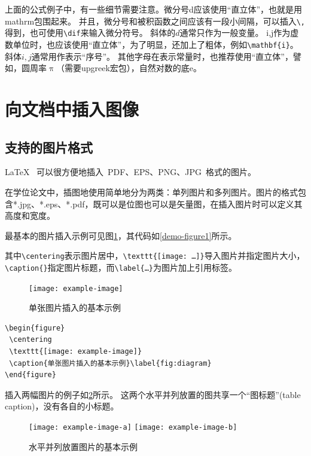 上面的公式例子中，有一些细节需要注意。微分号d应该使用``直立体''，也就是用mathrm包围起来。
并且，微分号和被积函数之间应该有一段小间隔，可以插入\verb+\,+得到，也可使用\verb+\dif+来输入微分符号。
斜体的$d$通常只作为一般变量。
i,j作为虚数单位时，也应该使用``直立体''，为了明显，还加上了粗体，例如\verb+\mathbf{i}+。斜体$i,j$通常用作表示``序号''。
其他字母在表示常量时，也推荐使用``直立体''，譬如，圆周率$\uppi$（需要upgreek宏包），自然对数的底$\mathrm{e}$。


\section{向文档中插入图像}
\label{sec:insertimage}

\subsection{支持的图片格式}
\label{sec:imageformat}

\LaTeX~ 可以很方便地插入~PDF、EPS、PNG、JPG~格式的图片。

在学位论文中，插图地使用简单地分为两类：单列图片和多列图片。图片的格式包含*.jpg、*.eps、*.pdf，既可以是位图也可以是矢量图，在插入图片时可以定义其高度和宽度。

最基本的图片插入示例可见图\ref{fig:diagram}，其代码如\ref{demo-figure1}所示。

其中\verb+\centering+表示图片居中，\verb+\texttt{[image: …]}+导入图片并指定图片大小，\verb+\caption{}+指定图片标题，而\verb+\label{…}+为图片加上引用标签。

\begin{figure}
 \centering
 \texttt{[image: example-image]}
 \caption{单张图片插入的基本示例}\label{fig:diagram}
\end{figure}

\begin{lstlisting}[language={[LaTeX]TeX}, caption={示例插图代码}, label=demo-figure1]
\begin{figure}
 \centering
 \texttt{[image: example-image]}
 \caption{单张图片插入的基本示例}\label{fig:diagram}
\end{figure}
\end{lstlisting}

插入两幅图片的例子如\ref{fig:png-jpg}所示。
这两个水平并列放置的图共享一个``图标题''(table caption)，没有各自的小标题。

\begin{figure}
  \centering
  \texttt{[image: example-image-a]}
  \hspace{1cm}
  \texttt{[image: example-image-b]}
  \caption{水平并列放置图片的基本示例}
  \label{fig:png-jpg}
\end{figure}

